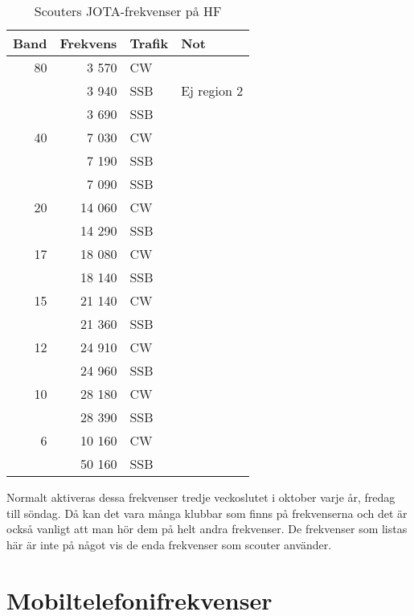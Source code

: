 \begin{table}[H]
\centering
\begin{tabular}{rrll}
	\textbf{Band} & \textbf{Frekvens} & \textbf{Trafik} & \textbf{Not} \\ \hline
               80 & 3 570  & CW  &             \\
	              & 3 940  & SSB & Ej region 2 \\
	              & 3 690  & SSB &             \\ \hline
	           40 & 7 030  & CW  &             \\
	              & 7 190  & SSB &             \\
	              & 7 090  & SSB &             \\ \hline
	           20 & 14 060 & CW  &             \\
	              & 14 290 & SSB &             \\ \hline
	           17 & 18 080 & CW  &             \\
	              & 18 140 & SSB &             \\ \hline
	           15 & 21 140 & CW  &             \\
	              & 21 360 & SSB &             \\ \hline
	           12 & 24 910 & CW  &             \\
	              & 24 960 & SSB &             \\ \hline
	           10 & 28 180 & CW  &             \\
	              & 28 390 & SSB &             \\ \hline
	            6 & 10 160 & CW  &             \\
	              & 50 160 & SSB &             \\ \hline
\end{tabular}
\caption{Scouters JOTA-frekvenser på HF}
\end{table}

Normalt aktiveras dessa frekvenser tredje veckoslutet i oktober varje år,
fredag till söndag. Då kan det vara många klubbar som finns på frekvenserna
och det är också vanligt att man hör dem på helt andra frekvenser. De
frekvenser som listas här är inte på något vis de enda frekvenser som scouter
använder.

\clearpage

\section{Mobiltelefonifrekvenser}
\label{mobiltelefoni}

